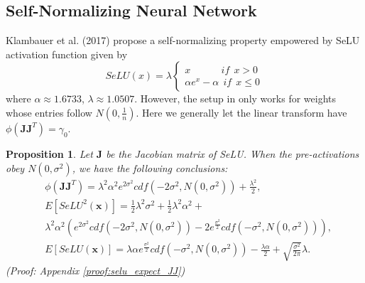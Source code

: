 \documentclass[10pt,journal,compsoc]{IEEEtran}
\newtheorem{prop}{Proposition}[section]
\begin{document}
\begin{comment}
\begin{Proposition}
    For series network activated by ReLU, the optimal $\mathbf{g}$ respect to ReLU is $\sqrt{\frac{2}{n}}$ and $\sqrt{\frac{2}{c_{in}\widetilde{k_hk_w}}}$ for fully-connected layer and convolutional layer, respectively.
\label{coro:weight_norm}
\end{Proposition}
Nonetheless, both  and Qiao et al. (2019) \cite{qiao2019weight} fail to provide the optimal $g$: the former one  while the latter one takes $g=1$. As a result, Salimans \& Kingma (2016) \cite{salimans2016weight} is less stable compared with BN in deep networks and Qiao et al. (2019) \cite{qiao2019weight} handle the gradient problem with additional group normalization. Actually, our conclusion is quiet similar to the NormProp proposed by , which normalizes the hidden layers with theoretical estimation of the distributions:
\end{comment} \subsection{Self-Normalizing Neural Network}\label{sec:self_normalizing_nn}
Klambauer et al. (2017) \cite{klambauer2017self} propose a self-normalizing property empowered by SeLU activation function given by 
\begin{equation}
    SeLU(x) = \lambda\left\{
             \begin{array}{lr}
             x~~~~~~~~~~~~~~if~~x>0  \\
             \alpha e^x-\alpha~~if~~x \le0
             \end{array}
\right. 
\label{equ:SELU}
\end{equation}
where $\alpha\approx 1.6733$, $\lambda \approx 1.0507$. However, the setup in \cite{klambauer2017self} only works for weights whose entries follow $N(0, \frac{1}{n})$. Here we generally let the linear transform have $\phi(\mathbf{JJ}^T)=\gamma_0$.

\begin{prop}
Let $\mathbf{J}$ be the Jacobian matrix of SeLU. When the pre-activations obey $N(0, \sigma^2)$, we have the following conclusions:
\begin{equation}
    \begin{split}
        & \phi\left(\mathbf{JJ}^T\right)=\lambda^2\alpha^2e^{2\sigma^2}cdf(-2\sigma^2, N(0, \sigma^2))+ \frac{\lambda^2}{2},\\
        & E[SeLU^2(\mathbf{x})]=\frac{1}{2}\lambda^2\sigma^2 + \frac{1}{2}\lambda^2\alpha^2 + \\
        & \lambda^2\alpha^2\left(e^{2\sigma^2}cdf(-2\sigma^2, N(0, \sigma^2))\!-\! 2e^{\frac{\sigma^2}{2}}cdf(-\sigma^2, N(0, \sigma^2))\right),\\
        & E[SeLU(\mathbf{x})] = \lambda\alpha e^{\frac{\sigma^2}{2}}cdf(-\sigma^2, N(0, \sigma^2))- \frac{\lambda\alpha}{2} + \sqrt{\frac{\sigma^2}{2\pi}}\lambda.
    \end{split}
\end{equation}
(Proof: Appendix \ref{proof:selu_expect_JJ})
\label{prop:selu_expect_JJ}
\end{prop}
\end{document}
